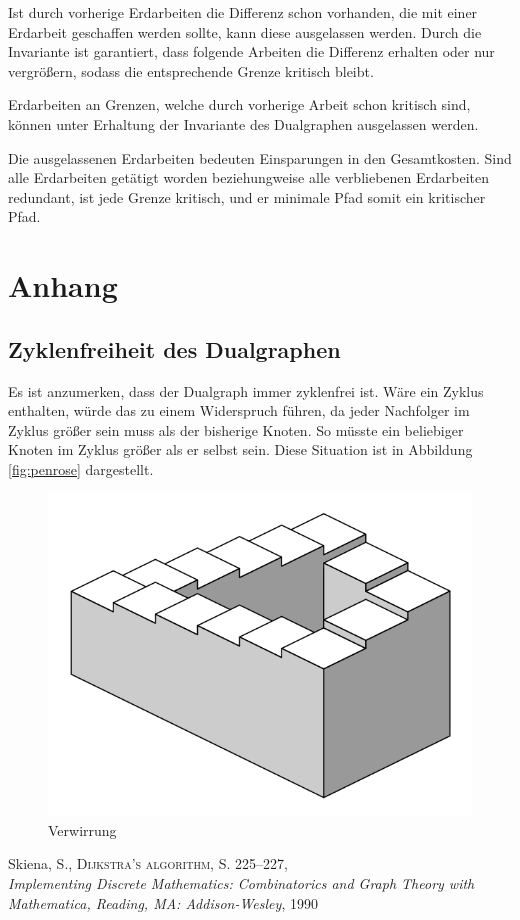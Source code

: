 \documentclass[a4paper, 12pt]{scrartcl}
\begin{document}
Ist durch vorherige Erdarbeiten die Differenz schon vorhanden, die mit einer Erdarbeit geschaffen werden sollte, kann diese ausgelassen werden. Durch die Invariante ist garantiert, dass folgende Arbeiten die Differenz erhalten oder nur vergrößern, sodass die entsprechende Grenze kritisch bleibt.
\begin{framed}
	Erdarbeiten an Grenzen, welche durch vorherige Arbeit schon kritisch sind, können unter Erhaltung der Invariante des Dualgraphen ausgelassen werden.
\end{framed}
Die ausgelassenen Erdarbeiten bedeuten Einsparungen in den Gesamtkosten. Sind alle Erdarbeiten getätigt worden beziehungweise alle verbliebenen Erdarbeiten redundant, ist jede Grenze kritisch, und er minimale Pfad somit ein kritischer Pfad.
\newpage
\section*{Anhang}
\subsection*{Zyklenfreiheit des Dualgraphen}
Es ist anzumerken, dass der Dualgraph immer zyklenfrei ist. Wäre ein Zyklus enthalten, würde das zu einem Widerspruch führen, da jeder Nachfolger im Zyklus größer sein muss als der bisherige Knoten. So müsste ein beliebiger Knoten im Zyklus größer als er selbst sein. Diese Situation ist in Abbildung \eqref{fig:penrose} dargestellt.
\begin{figure}[H]
	\centering
	\includegraphics[width=.5\textwidth]{img/penrose}
	\caption{Verwirrung}
	\label{fig:penrose}
\end{figure}
\begin{thebibliography}{9}
	Skiena, S., \textsc{Dijkstra’s algorithm}, S. 225--227,\\
  \emph{Implementing Discrete Mathematics: Combinatorics and Graph Theory with Mathematica, Reading, MA: Addison-Wesley},
  1990
\end{thebibliography}
\newpage
\end{document}
